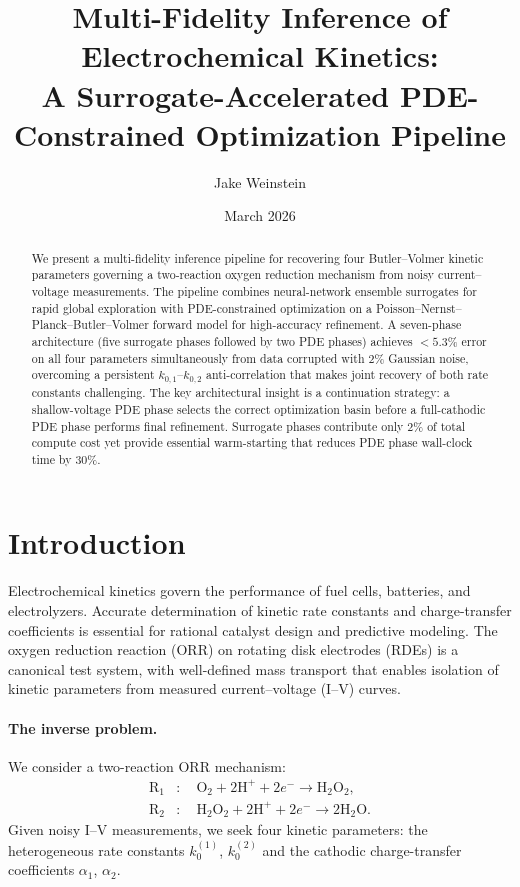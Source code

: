 \documentclass[11pt,a4paper]{article}
\title{Multi-Fidelity Inference of Electrochemical Kinetics:\\
A Surrogate-Accelerated PDE-Constrained Optimization Pipeline}
\author{Jake Weinstein}
\date{March 2026}
\newcommand{\kzero}{k_0}
\begin{document}
\maketitle

\begin{abstract}
We present a multi-fidelity inference pipeline for recovering four
Butler--Volmer kinetic parameters governing a two-reaction oxygen reduction
mechanism from noisy current--voltage measurements. The pipeline combines
neural-network ensemble surrogates for rapid global exploration with
PDE-constrained optimization on a Poisson--Nernst--Planck--Butler--Volmer
forward model for high-accuracy refinement. A seven-phase architecture
(five surrogate phases followed by two PDE phases) achieves
$< 5.3\%$ error on all four parameters simultaneously from data
corrupted with $2\%$ Gaussian noise, overcoming a persistent
$k_{0,1}$--$k_{0,2}$ anti-correlation that makes joint recovery
of both rate constants challenging.
The key architectural insight is a continuation strategy: a shallow-voltage
PDE phase selects the correct optimization basin before a full-cathodic
PDE phase performs final refinement. Surrogate phases contribute only
$2\%$ of total compute cost yet provide essential warm-starting that
reduces PDE phase wall-clock time by $30\%$.
\end{abstract}

\tableofcontents
\newpage

\section{Introduction}\label{sec:intro}

Electrochemical kinetics govern the performance of fuel cells, batteries,
and electrolyzers. Accurate determination of kinetic rate constants and
charge-transfer coefficients is essential for rational catalyst design and
predictive modeling. The oxygen reduction reaction (ORR) on rotating disk
electrodes (RDEs) is a canonical test system, with well-defined mass
transport that enables isolation of kinetic parameters from measured
current--voltage (I--V) curves.

\paragraph{The inverse problem.}
We consider a two-reaction ORR mechanism:
\begin{align}
  \text{R}_1&: \quad \mathrm{O_2} + 2\mathrm{H^+} + 2e^- \to
    \mathrm{H_2O_2}, \label{eq:R1}\\
  \text{R}_2&: \quad \mathrm{H_2O_2} + 2\mathrm{H^+} + 2e^- \to
    2\mathrm{H_2O}. \label{eq:R2}
\end{align}
Given noisy I--V measurements, we seek four kinetic parameters:
the heterogeneous rate constants $\kzero^{(1)}$, $\kzero^{(2)}$ and the
cathodic charge-transfer coefficients $\alpha_1$, $\alpha_2$.
\end{document}
